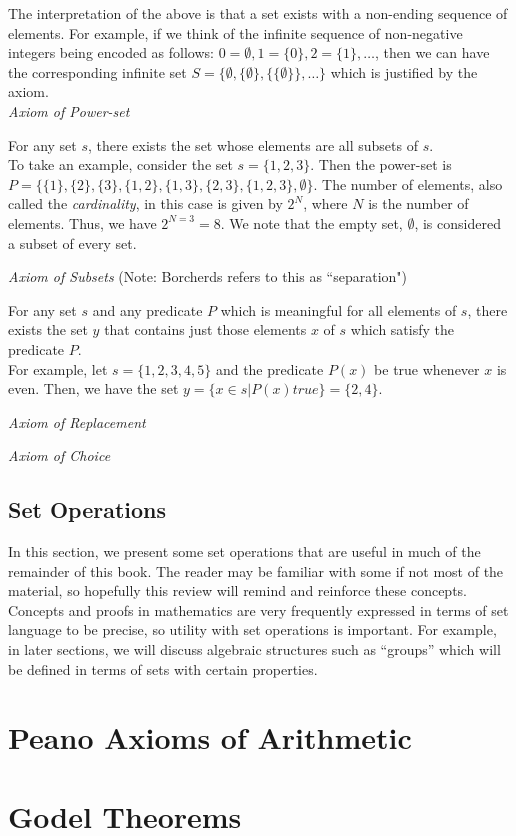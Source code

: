 The interpretation of the above is that a set exists with a non-ending sequence of elements.  For example, if we think of the infinite sequence of non-negative integers being encoded as follows:  $0 = \emptyset, 1=\{ 0 \}, 2=\{1\}, \ldots$, then we can have the corresponding infinite set $S=\{\emptyset, \{\emptyset\}, \{\{\emptyset\}\}, \ldots \}$ which is justified by the axiom.\\

\textit{Axiom of Power-set}

For any set $s$, there exists the set whose elements are all subsets of $s$.\\

To take an example, consider the set $s = \{1,2,3 \}$.  Then the power-set is $P=\{\{1\}, \{2\}, \{3\}, \{1,2\}, \{1,3\}, \{2,3\}, \{1,2,3\}, \emptyset \}$.  The number of elements, also called the \textit{cardinality}, in this case is given by $2^{N}$, where $N$ is the number of elements.  Thus, we have $2^{N=3}=8$.  We note that the empty set, $\emptyset$, is considered a subset of every set.

\textit{Axiom of Subsets}  (Note: Borcherds refers to this as ``separation")

For any set $s$ and any predicate $P$ which is meaningful for all elements of $s$, there exists the set $y$ that contains just those elements $x$ of $s$ which satisfy the predicate $P$. \\

For example, let $s=\{1,2,3,4,5\}$ and the predicate $P\left(x\right)$ be true whenever $x$ is even.  Then, we have the set $y = \{x \in s | P (x) \textit{true} \} = \{2,4\}$.

\textit{Axiom of Replacement}

\textit{Axiom of Choice}

\subsection{Set Operations}

In this section, we present some set operations that are useful in much of the remainder of this book.  The reader may be familiar with some if not most of the material, so hopefully this review will remind and reinforce these concepts.  Concepts and proofs in mathematics are very frequently expressed in terms of set language to be precise, so utility with set operations is important.  For example, in later sections, we will discuss algebraic structures such as ``groups'' which will be defined in terms of sets with certain properties.


\section{Peano Axioms of Arithmetic}

\section{Godel Theorems}